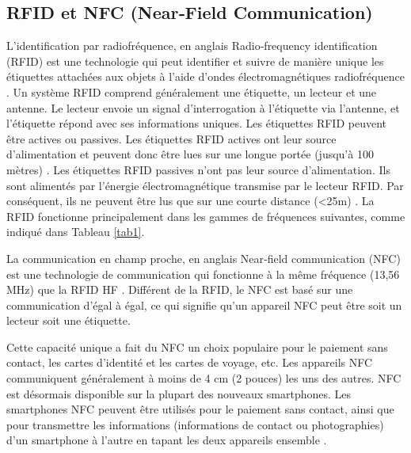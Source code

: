 \subsection{RFID et NFC (Near‐Field Communication)}
L'identification par radiofréquence, en anglais Radio‐frequency identification (RFID) est une technologie qui peut identifier et suivre de manière unique les étiquettes attachées aux objets à l'aide d'ondes électromagnétiques radiofréquence \cite{agrawal2013survey}. Un système RFID comprend généralement une étiquette, un lecteur et une antenne. Le lecteur envoie un signal d'interrogation à l'étiquette via l'antenne, et l'étiquette répond avec ses informations uniques. Les étiquettes RFID peuvent être actives ou passives. Les étiquettes RFID actives ont leur source d'alimentation et peuvent donc être lues sur une longue portée (jusqu'à 100 mètres) \cite{amendola2014rfid}. Les étiquettes RFID passives n'ont pas leur source d'alimentation. Ils sont alimentés par l'énergie électromagnétique transmise par le lecteur RFID. Par conséquent, ils ne peuvent être lus que sur une courte distance (<25m) \cite{jia2012rfid}. La RFID fonctionne principalement dans les gammes de fréquences suivantes, comme indiqué dans Tableau \ref{tab1}.


La communication en champ proche, en anglais Near‐field communication (NFC) est une technologie de communication qui fonctionne à la même fréquence (13,56 MHz) que la RFID HF \cite{al2016comparison}. Différent de la RFID, le NFC est basé sur une communication d'égal à égal, ce qui signifie qu'un appareil NFC peut être soit un lecteur soit une étiquette.


Cette capacité unique a fait du NFC un choix populaire pour le paiement sans contact, les cartes d'identité et les cartes de voyage, etc. Les appareils NFC communiquent généralement à moins de 4 cm (2 pouces) les uns des autres. NFC est désormais disponible sur la plupart des nouveaux smartphones. Les smartphones NFC peuvent être utilisés pour le paiement sans contact, ainsi que pour transmettre les informations (informations de contact ou photographies) d'un smartphone à l'autre en tapant les deux appareils ensemble \cite{shah2016survey}.

